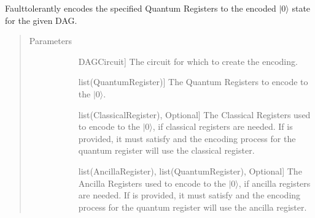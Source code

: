 \documentclass[letterpaper,10pt,english]{sphinxmanual}
\begin{document}
\begin{fulllineitems}
\begin{fulllineitems}
\begin{quote}
\begin{description}
\begin{description}
\end{description}

\end{description}\end{quote}

\end{fulllineitems}


\begin{fulllineitems}
\label{\detokenize{Steane:Steane.SteaneFaultTolerantEncoder.getEncoderDag}}
Fault\sphinxhyphen{}tolerantly encodes the specified Quantum Registers to the encoded \(|0\rangle\) state for the given DAG.
\begin{quote}\begin{description}
\item[{Parameters}] \leavevmode\begin{description}
\item[{}] \leavevmode{[}DAGCircuit{]}
The circuit for which to create the encoding.

\item[{}] \leavevmode{[}list(QuantumRegister){]}
The Quantum Registers to encode to the \(|0\rangle\).

\item[{}] \leavevmode{[}list(ClassicalRegister), Optional{]}
The Classical Registers used to encode to the \(|0\rangle\), if classical registers are needed. If  is provided, it must satisfy  and the encoding process for the  quantum register will use the  classical register.

\item[{}] \leavevmode{[}list(AncillaRegister), list(QuantumRegister), Optional{]}
The Ancilla Registers used to encode to the \(|0\rangle\), if ancilla registers are needed. If  is provided, it must satisfy  and the encoding process for the  quantum register will use the  ancilla register.


\end{description}
\end{description}
\end{quote}
\end{fulllineitems}
\end{fulllineitems}
\end{document}
